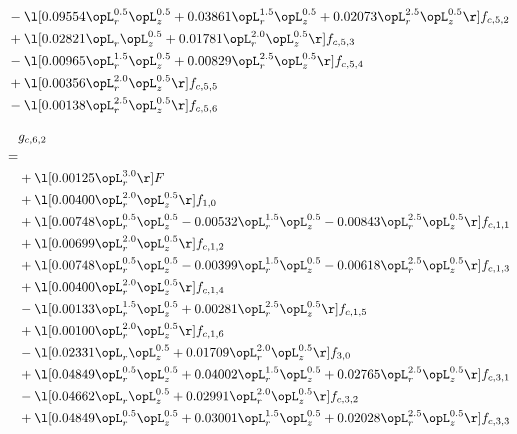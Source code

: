 \begin{alignat}{2}
& - \l[  0.09554 \opL_r^{0.5} \opL_z^{0.5} +  0.03861 \opL_r^{1.5} \opL_z^{0.5} +  0.02073 \opL_r^{2.5} \opL_z^{0.5}  \r] f_{c,5,2} \nonumber \\ 
& + \l[  0.02821 \opL_r \opL_z^{0.5} +  0.01781 \opL_r^{2.0} \opL_z^{0.5}  \r] f_{c,5,3} \nonumber \\ 
& - \l[  0.00965 \opL_r^{1.5} \opL_z^{0.5} +  0.00829 \opL_r^{2.5} \opL_z^{0.5}  \r] f_{c,5,4} \nonumber \\ 
& + \l[  0.00356 \opL_r^{2.0} \opL_z^{0.5}  \r] f_{c,5,5} \nonumber \\ 
& - \l[  0.00138 \opL_r^{2.5} \opL_z^{0.5}  \r] f_{c,5,6} \nonumber \\ 
\end{alignat} 


\begin{alignat}{2} 
\label{eq:g_62_0} 
& g_{c,6,2} \nonumber \\ 
 = \\ 
& + \l[  0.00125 \opL_r^{3.0}  \r] F \nonumber \\ 
& + \l[  0.00400 \opL_r^{2.0} \opL_z^{0.5}  \r] f_{1,0} \nonumber \\ 
& + \l[  0.00748 \opL_r^{0.5} \opL_z^{0.5}   -0.00532 \opL_r^{1.5} \opL_z^{0.5}   -0.00843 \opL_r^{2.5} \opL_z^{0.5}  \r] f_{c,1,1} \nonumber \\ 
& + \l[  0.00699 \opL_r^{2.0} \opL_z^{0.5}  \r] f_{c,1,2} \nonumber \\ 
& + \l[  0.00748 \opL_r^{0.5} \opL_z^{0.5}   -0.00399 \opL_r^{1.5} \opL_z^{0.5}   -0.00618 \opL_r^{2.5} \opL_z^{0.5}  \r] f_{c,1,3} \nonumber \\ 
& + \l[  0.00400 \opL_r^{2.0} \opL_z^{0.5}  \r] f_{c,1,4} \nonumber \\ 
& - \l[  0.00133 \opL_r^{1.5} \opL_z^{0.5} +  0.00281 \opL_r^{2.5} \opL_z^{0.5}  \r] f_{c,1,5} \nonumber \\ 
& + \l[  0.00100 \opL_r^{2.0} \opL_z^{0.5}  \r] f_{c,1,6} \nonumber \\ 
& - \l[  0.02331 \opL_r \opL_z^{0.5} +  0.01709 \opL_r^{2.0} \opL_z^{0.5}  \r] f_{3,0} \nonumber \\ 
& + \l[  0.04849 \opL_r^{0.5} \opL_z^{0.5} +  0.04002 \opL_r^{1.5} \opL_z^{0.5} +  0.02765 \opL_r^{2.5} \opL_z^{0.5}  \r] f_{c,3,1} \nonumber \\ 
& - \l[  0.04662 \opL_r \opL_z^{0.5} +  0.02991 \opL_r^{2.0} \opL_z^{0.5}  \r] f_{c,3,2} \nonumber \\ 
& + \l[  0.04849 \opL_r^{0.5} \opL_z^{0.5} +  0.03001 \opL_r^{1.5} \opL_z^{0.5} +  0.02028 \opL_r^{2.5} \opL_z^{0.5}  \r] f_{c,3,3} \nonumber \\ 

\end{alignat}
